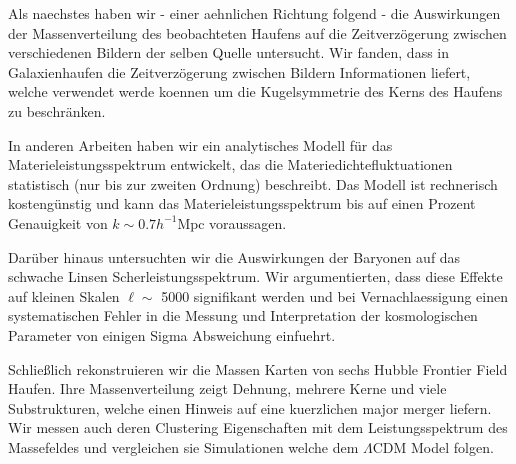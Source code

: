 Als naechstes haben wir - einer aehnlichen Richtung folgend - die Auswirkungen der Massenverteilung des beobachteten Haufens auf die Zeitverzögerung zwischen verschiedenen Bildern der selben Quelle untersucht.
Wir fanden, dass in Galaxienhaufen die Zeitverzögerung zwischen Bildern Informationen liefert, welche verwendet werde koennen um die Kugelsymmetrie des Kerns des Haufens zu beschränken.

In anderen Arbeiten haben wir ein analytisches Modell für das Materieleistungsspektrum entwickelt, das die Materiedichtefluktuationen statistisch (nur bis zur zweiten Ordnung) beschreibt.
Das Modell ist  rechnerisch kostengünstig und kann das Materieleistungsspektrum bis auf einen Prozent Genauigkeit von $k \sim 0.7 h^{- 1} \mathrm{Mpc}$ voraussagen.

Darüber hinaus untersuchten wir die Auswirkungen der Baryonen auf das schwache Linsen Scherleistungsspektrum. Wir argumentierten, dass diese Effekte auf kleinen Skalen $\ell \sim$ 5000 signifikant werden und bei Vernachlaessigung einen systematischen Fehler in die Messung und Interpretation der kosmologischen Parameter von einigen Sigma Absweichung einfuehrt.

Schließlich rekonstruieren wir die Massen Karten von sechs Hubble Frontier Field Haufen. 
Ihre Massenverteilung zeigt Dehnung, mehrere Kerne und viele Substrukturen, welche einen Hinweis auf eine kuerzlichen major merger liefern.
Wir messen auch deren Clustering Eigenschaften mit dem Leistungsspektrum des Massefeldes und vergleichen sie Simulationen welche dem $\Lambda$CDM Model folgen.

